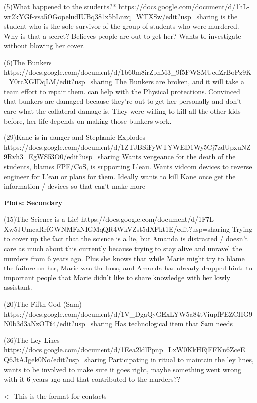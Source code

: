 \documentclass[char]{GL2020}
\begin{document}
(5)What happened to the students?*
https://docs.google.com/document/d/1hL-wr2kYGf-vsa5OGopeludIUBq381x5bLnzq_WTXSw/edit?usp=sharing
\cAssistantScientist{} is the student who is the sole survivor of the group of students who were murdered.  Why is that a secret?  Believes people are out to get her?  Wants to investigate without blowing her cover.

(6)The Bunkers
https://docs.google.com/document/d/1b60m8irZphM3_9f5FWSMUcdZrBoPz9K_Y0rcXGIDqLM/edit?usp=sharing
The Bunkers are broken, and it will take a team effort to repair them.  \cAssistantScientist{} can help with the Physical protections.  Convinced that bunkers are damaged because they’re out to get her personally and don’t care what the collateral damage is.  They were willing to kill all the other kids before, her life depends on making those bunkers work.

(29)Kane is in danger and Stephanie Explodes
https://docs.google.com/document/d/1ZTJBSiFyWTYWED1Wy5Cj7zdUpxuNZ9Rvh3_EgWS53O0/edit?usp=sharing
Wants vengeance for the death of the students, blames FPF/CoS, is supporting L'eau.  Wants vidcom devices to reverse engineer for L'eau or plans for them.  Ideally wants to kill Kane once get the information / devices so that can't make more

\textbf{Plots: Secondary}

(15)The Science is a Lie!
https://docs.google.com/document/d/1F7L-Xw5JUmcaRrfGWNMFzNIGMqQR4WkVZst5dXFkt1E/edit?usp=sharing
Trying to cover up the fact that the science is a lie, but Amanda is distracted / doesn't care as much about this currently because trying to stay alive and unravel the murders from 6 years ago. Plus she knows that while Marie might try to blame the failure on her, Marie was the boss, and Amanda has already dropped hints to important people that Marie didn’t like to share knowledge with her lowly assistant. 

(20)The Fifth God (Sam)
https://docs.google.com/document/d/1V_DgaQyGExLYW5a84tViupfFEZCHG9N0b3d3aNzOT64/edit?usp=sharing
Has technological item that Sam needs

(36)The Ley Lines
https://docs.google.com/document/d/1Eea2ldlPpnp_LxW0KkHEjFFKn6ZceE_Q6JtAJgek0No/edit?usp=sharing
Participating in ritual to maintain the ley lines, wants to be involved to make sure it goes right, maybe something went wrong with it 6 years ago and that contributed to the murders??

\begin{itemz}[Goals]
	\item 
\end{itemz}

\begin{itemz}[Notes]
	\item 
\end{itemz}

\begin{contacts}
	\contact{\cTest{}} <- This is the format for contacts 
\end{contacts}
\end{document}
